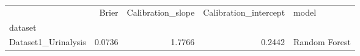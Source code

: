 \begin{tabular}{lrrrl}
\toprule
 & Brier & Calibration_slope & Calibration_intercept & model \\
dataset &  &  &  &  \\
\midrule
Dataset1_Urinalysis & 0.0736 & 1.7766 & 0.2442 & Random Forest \\
\bottomrule
\end{tabular}
